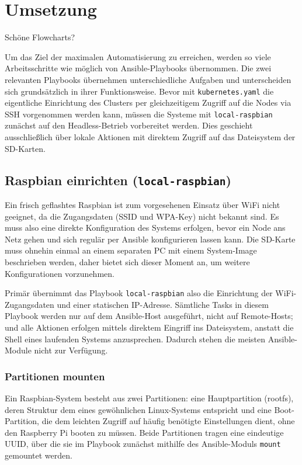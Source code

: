 \chapter{Umsetzung}
Schöne Flowcharts?

Um das Ziel der maximalen Automatisierung zu erreichen, werden so viele Arbeitsschritte wie möglich von Ansible-Playbooks übernommen.
Die zwei relevanten Playbooks übernehmen unterschiedliche Aufgaben und unterscheiden sich grundsätzlich in ihrer Funktionsweise.
Bevor mit \texttt{kubernetes.yaml} die eigentliche Einrichtung des Clusters per gleichzeitigem Zugriff auf die Nodes via SSH vorgenommen werden kann, müssen die Systeme mit \texttt{local-raspbian} zunächst auf den Headless-Betrieb vorbereitet werden.
Dies geschieht ausschließlich über lokale Aktionen mit direktem Zugriff auf das Dateisystem der SD-Karten.

\section{Raspbian einrichten (\texttt{local-raspbian})}

Ein frisch geflashtes Raspbian ist zum vorgesehenen Einsatz über WiFi nicht geeignet, da die Zugangsdaten (SSID und WPA-Key) nicht bekannt sind.
Es muss also eine direkte Konfiguration des Systems erfolgen, bevor ein Node ans Netz gehen und sich regulär per Ansible konfigurieren lassen kann.
Die SD-Karte muss ohnehin einmal an einem separaten PC mit einem System-Image beschrieben werden, daher bietet sich dieser Moment an, um weitere Konfigurationen vorzunehmen.

Primär übernimmt das Playbook \texttt{local-raspbian} also die Einrichtung der WiFi-Zugangsdaten und einer statischen IP-Adresse.
Sämtliche Tasks in diesem Playbook werden nur auf dem Ansible-Host ausgeführt, nicht auf Remote-Hosts; und alle Aktionen erfolgen mittels direktem Eingriff ins Dateisystem, anstatt die Shell eines laufenden Systems anzusprechen.
Dadurch stehen die meisten Ansible-Module nicht zur Verfügung.

\subsection{Partitionen mounten}

Ein Raspbian-System besteht aus zwei Partitionen: eine Hauptpartition (rootfs), deren Struktur dem eines gewöhnlichen Linux-Systems entspricht und eine Boot-Partition, die dem leichten Zugriff auf häufig benötigte Einstellungen dient, ohne den Raspberry Pi booten zu müssen.
Beide Partitionen tragen eine eindeutige UUID, über die sie im Playbook zunächst mithilfe des Ansible-Moduls \texttt{mount} gemountet werden.

